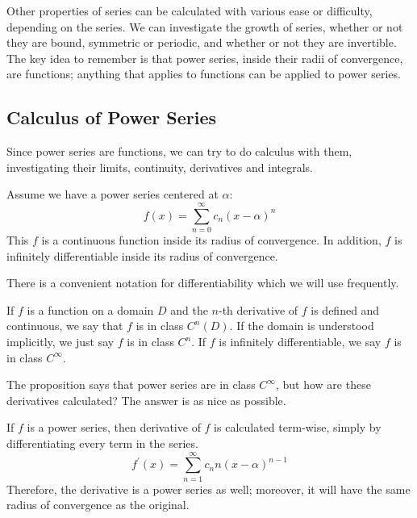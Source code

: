 \documentclass[fleqn,letterpaper]{report}
\begin{document}
Other properties of series can be calculated with various ease
or difficulty, depending on the series. We can investigate the
growth of series, whether or not they are bound, symmetric or
periodic, and whether or not they are invertible. The key idea
to remember is that power
series, inside their radii of convergence, are functions;
anything that applies to functions can be applied to power
series.

\subsection{Calculus of Power Series}
\label{calculus-of-power-series}

Since power series are functions, we can try to do calculus
with them, investigating their limits, continuity, derivatives
and integrals.

\begin{prop}
Assume we have a power series centered at $\alpha$:
\begin{equation*}
f(x) = \sum_{n=0}^\infty c_n (x-\alpha)^n
\end{equation*}
This $f$ is a continuous function inside its radius of
convergence. In addition, $f$ is infinitely differentiable
inside its radius of convergence.
\end{prop}

There is a convenient notation for differentiability which we
will use frequently.

\begin{defn}
If $f$ is a function on a domain $D$ and the $n$-th derivative
of $f$ is defined and continuous, we say that $f$ is in class
$C^n(D)$. If the domain is understood implicitly, we just say
$f$ is in class $C^n$. If $f$ is infinitely differentiable,
we say $f$ is in class $C^\infty$. 
\end{defn}

The proposition says that power series are in class $C^\infty$, but
how are these derivatives calculated? The answer is as nice
as possible.

\begin{prop}
If $f$ is a power series, then derivative of $f$ is
calculated term-wise, simply by differentiating every term in
the series.
\begin{equation*}
f^\prime(x) = \sum_{n=1}^\infty c_n n(x-\alpha)^{n-1}
\end{equation*}
Therefore, the derivative is a power series as well; moreover,
it will have the same radius of convergence as the original.
\end{prop}
\end{document}
